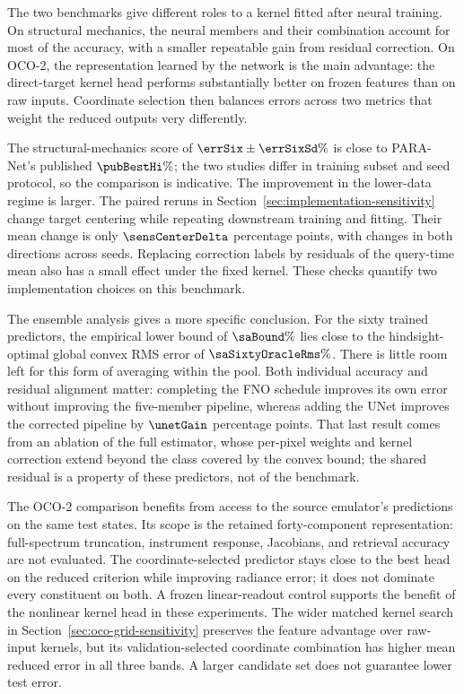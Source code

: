 The two benchmarks give different roles to a kernel fitted after neural training. On structural mechanics, the neural members and their combination account for most of the accuracy, with a smaller repeatable gain from residual correction. On OCO-2, the representation learned by the network is the main advantage: the direct-target kernel head performs substantially better on frozen features than on raw inputs. Coordinate selection then balances errors across two metrics that weight the reduced outputs very differently.

The structural-mechanics score of $\errSix\pm\errSixSd\%$ is close to PARA-Net's published $\pubBestHi\%$; the two studies differ in training subset and seed protocol, so the comparison is indicative. The improvement in the lower-data regime is larger. The paired reruns in Section~\ref{sec:implementation-sensitivity} change target centering while repeating downstream training and fitting. Their mean change is only $\sensCenterDelta$ percentage points, with changes in both directions across seeds. Replacing correction labels by residuals of the query-time mean also has a small effect under the fixed kernel. These checks quantify two implementation choices on this benchmark.

The ensemble analysis gives a more specific conclusion. For the sixty trained predictors, the empirical lower bound of $\saBound\%$ lies close to the hindsight-optimal global convex RMS error of $\saSixtyOracleRms\%$. There is little room left for this form of averaging within the pool. Both individual accuracy and residual alignment matter: completing the FNO schedule improves its own error without improving the five-member pipeline, whereas adding the UNet improves the corrected pipeline by $\unetGain$ percentage points. That last result comes from an ablation of the full estimator, whose per-pixel weights and kernel correction extend beyond the class covered by the convex bound; the shared residual is a property of these predictors, not of the benchmark.

The OCO-2 comparison benefits from access to the source emulator's predictions on the same test states. Its scope is the retained forty-component representation: full-spectrum truncation, instrument response, Jacobians, and retrieval accuracy are not evaluated. The coordinate-selected predictor stays close to the best head on the reduced criterion while improving radiance error; it does not dominate every constituent on both. A frozen linear-readout control supports the benefit of the nonlinear kernel head in these experiments. The wider matched kernel search in Section~\ref{sec:oco-grid-sensitivity} preserves the feature advantage over raw-input kernels, but its validation-selected coordinate combination has higher mean reduced error in all three bands. A larger candidate set does not guarantee lower test error.

